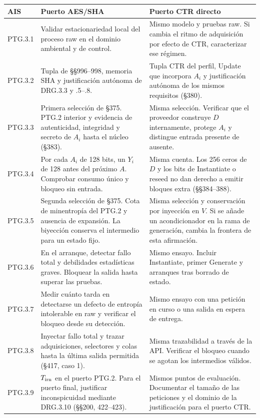 \begin{center}
\small
\begin{tabularx}{\linewidth}{@{}lYY@{}}
\toprule
AIS & Puerto AES/SHA & Puerto CTR directo \\
\midrule
PTG.3.1 & Validar estacionariedad local del proceso raw en el dominio ambiental y de control. &
Mismo modelo y pruebas raw. Si cambia el ritmo de adquisición por efecto de CTR, caracterizar ese régimen. \\
PTG.3.2 & Tupla de §§996--998, memoria SHA y justificación autónoma de DRG.3.3 y .5--.8. &
Tupla CTR del perfil, Update que incorpora $A_i$ y justificación autónoma de los mismos requisitos (§380). \\
PTG.3.3 & Primera selección de §375. PTG.2 interior y evidencia de autenticidad, integridad y secreto de $A_i$ hasta el núcleo (§383). &
Misma selección. Verificar que el proveedor construye $D$ internamente, protege $A_i$ y distingue entrada presente de ausente. \\
PTG.3.4 & Por cada $A_i$ de 128 bits, un $Y_i$ de 128 antes del próximo $A$. Comprobar consumo único y bloqueo sin entrada. &
Misma cuenta. Los 256 ceros de $D$ y los bits de Instantiate o reseed no dan derecho a emitir bloques extra (§§384--388). \\
PTG.3.5 & Segunda selección de §375. Cota de minentropía del PTG.2 y ausencia de expansión. La biyección conserva el intermedio para un estado fijo. &
Misma selección y conservación por inyección en $V$. Si se añade un acondicionador en la rama de generación, cambia la frontera de esta afirmación. \\
PTG.3.6 & En el arranque, detectar fallo total y debilidades estadísticas graves. Bloquear la salida hasta superar las pruebas. &
Mismo ensayo. Incluir Instantiate, primer Generate y arranques tras borrado de estado. \\
PTG.3.7 & Medir cuánto tarda en detectarse un defecto de entropía intolerable en raw y verificar el bloqueo desde su detección. &
Mismo ensayo con una petición en curso o una salida en espera de entrega. \\
PTG.3.8 & Inyectar fallo total y trazar adquisiciones, selectores y colas hasta la última salida permitida (§417, caso 1). &
Misma trazabilidad a través de la API. Verificar el bloqueo cuando se agotan los intermedios válidos. \\
PTG.3.9 & $T_{\rm irn}$ en el puerto PTG.2. Para el puerto final, justificar inconspicuidad mediante DRG.3.10 (§§200, 422--423). &
Mismos puntos de evaluación. Documentar el tamaño de las peticiones y el dominio de la justificación para el puerto CTR. \\
\bottomrule
\end{tabularx}
\end{center}

